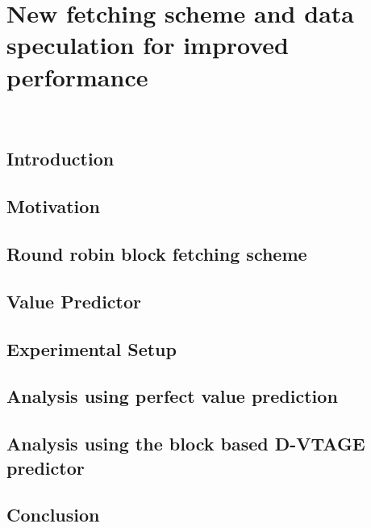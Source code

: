 \chapter{New fetching scheme and data speculation for improved performance}~\label{chp:hardchanges}
\vspace{-2em}
\section{Introduction}\label{sect:introduction-chapter3}

\section{Motivation}\label{sect:ch3-motivation}

\vspace{-1em}
\section{Round robin block fetching scheme}\label{chp3:sec:fetch}
\vspace{-1em}

\section{Value Predictor}
\label{chp3:sec:val}
\vspace{-1em}
\section{Experimental Setup}
\vspace{-1em}
\label{chp:chp3:sec:exp}
\section{Analysis using perfect value prediction}\label{chp:chp3:sec:analysis}

\vspace{-1em}
\section{Analysis using the block based D-VTAGE predictor}
\label{chp:chp3:sec:analysis2}
\section{Conclusion}

%
%
